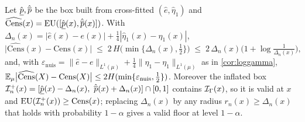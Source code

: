 \begin{proposition}
\label{prop:cens-plugin}
Let $\hat{\underline{p}},\hat{\overline{p}}$ be the box built from cross-fitted $(\hat e,\hat\eta_1)$ and
$\widehat{\mathrm{Cens}}(x)=\mathrm{EU}([\hat{\underline{p}}(x),\hat{\overline{p}}(x)])$. With
$\Delta_n(x)=|\hat e(x)-e(x)|+\tfrac14|\hat\eta_1(x)-\eta_1(x)|$,
\begin{equation}
  \big|\widehat{\mathrm{Cens}}(x)-\mathrm{Cens}(x)\big|\;\le\;2\,H\big(\min\{\Delta_n(x),\tfrac12\}\big)
  \;\le\;2\,\Delta_n(x)\big(1+\log\tfrac1{\Delta_n(x)}\big),
  \label{eq:cens-plugin}
\end{equation}
and, with $\varepsilon_{\mathrm{nuis}}=\|\hat e-e\|_{L^1(\mu)}+\tfrac14\|\hat\eta_1-\eta_1\|_{L^1(\mu)}$
as in \cref{cor:loggamma},
$\mathbb{E}_\mu\big|\widehat{\mathrm{Cens}}(X)-\mathrm{Cens}(X)\big|\le 2H(\min\{\varepsilon_{\mathrm{nuis}},\tfrac12\})$.
Moreover the inflated box $\I^{+}_n(x)=[\hat\plo(x)-\Delta_n(x),\ \hat\pup(x)+\Delta_n(x)]\cap[0,1]$
contains $\mathcal{I}_\Gamma(x)$, so it is valid at $x$ and $\mathrm{EU}(\mathcal{I}^{+}_n(x))\ge\mathrm{Cens}(x)$;
replacing $\Delta_n(x)$ by any radius $r_n(x)\ge\Delta_n(x)$ that holds with probability $1-\alpha$
gives a valid floor at level $1-\alpha$.
\end{proposition}

